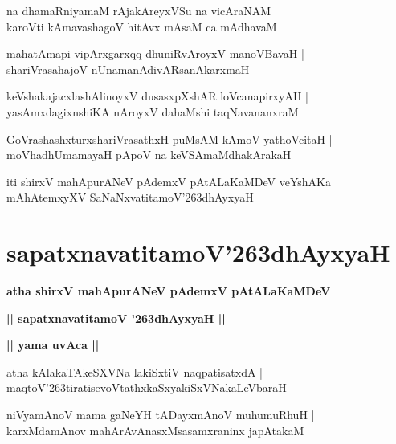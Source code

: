 \documentclass[twoside,12pt,openright]{book}
\def\S{\char'263}
\newcounter{shloka}[chapter]
\def\uvaca#1{\centerline{{\large\textbf{#1}}}}
\begin{document}
\begin{shloka}%
na dhamaRniyamaM rAjakAreyxVSu na vicAraNAM |\\
karoVti kAmavashagoV hitAvx mAsaM ca mAdhavaM 
\end{shloka}

\begin{shloka}%
mahatAmapi vipArxgarxqq dhuniRvAroyxV manoVBavaH |\\
shariVrasahajoV nUnamanAdivARsanAkarxmaH 
\end{shloka}

\begin{shloka}%
keVshakajacxlashAlinoyxV dusasxpXshAR loVcanapirxyAH |\\
yasAmxdagixnshiKA nAroyxV dahaMshi taqNavananxraM 
\end{shloka}

\begin{shloka}%
GoVrashashxturxshariVrasathxH puMsAM kAmoV yathoVcitaH |\\
moVhadhUmamayaH pApoV na keVSAmaMdhakArakaH 
\end{shloka}

\begin{center}
iti shirxV mahApurANeV pAdemxV pAtALaKaMDeV veYshAKa mAhAtemxyXV 
SaNaNxvatitamoV\S dhAyxyaH
\end{center}

\chapter{sapatxnavatitamoV\S dhAyxyaH}

\begin{center}
{\LARGE\bfseries atha shirxV mahApurANeV pAdemxV pAtALaKaMDeV }
\end{center}

\begin{center}         
{\LARGE\bfseries || sapatxnavatitamoV \S dhAyxyaH ||}
\end{center}

\uvaca{|| yama uvAca ||}

\begin{shloka}%
atha kAlakaTAkeSXVNa lakiSxtiV naqpatisatxdA |\\
maqtoV\S tiratisevoVtathxkaSxyakiSxVNakaLeVbaraH
\end{shloka}

\begin{shloka}%
niVyamAnoV mama gaNeYH tADayxmAnoV muhumuRhuH |\\
karxMdamAnov mahArAvAnasxMsasamxraninx japAtakaM 
\end{shloka}
\end{document}
